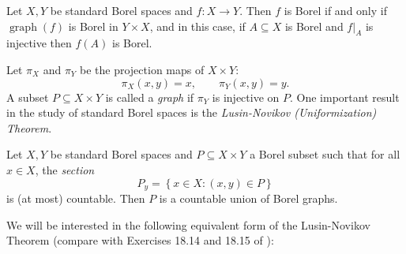 \begin{theorem}\label{theoremkechrisborelmapsofstandardaregood}%
Let $X,Y$ be standard Borel spaces and $f:X\to Y$. Then $f$ is Borel if and only if $\operatorname{graph}(f)$ is Borel in $Y\times X$, and in this case, if $A\subseteq X$ is Borel and $f|_A$ is injective then $f(A)$ is Borel.
\end{theorem}

Let $\pi_X$ and $\pi_Y$ be the projection maps of $X\times Y$:
\[\pi_X(x,y)=x,\qquad\pi_Y(x,y)=y.\]
A subset $P\subseteq X\times Y$ is called a \emph{graph} if $\pi_Y$ is injective on $P$.%
%
One important result in the study of standard Borel spaces is the \emph{Lusin-Novikov (Uniformization) Theorem}.

\begin{theorem}[{\cite[Theorem 18.10]{MR1321597}}]\label{theoremlusinnovikov}%
Let $X,Y$ be standard Borel spaces and $P\subseteq X\times Y$ a Borel subset such that for all $x\in X$, the \emph{section}
\[P_y=\left\{x\in X:(x,y)\in P\right\}\]
is (at most) countable. Then $P$ is a countable union of Borel graphs.
\end{theorem}

We will be interested in the following equivalent form of the Lusin-Novikov Theorem (compare with Exercises 18.14 and 18.15 of \cite{MR1321597}):

